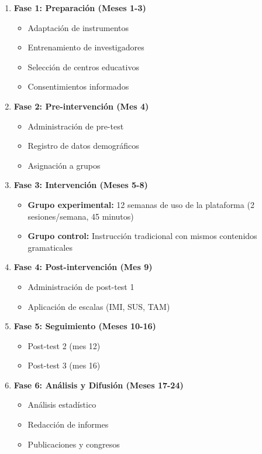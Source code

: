 \documentclass[12pt,a4paper]{article}
\begin{document}
\begin{enumerate}
    \item \textbf{Fase 1: Preparación (Meses 1-3)}
    \begin{itemize}
        \item Adaptación de instrumentos
        \item Entrenamiento de investigadores
        \item Selección de centros educativos
        \item Consentimientos informados
    \end{itemize}
    
    \item \textbf{Fase 2: Pre-intervención (Mes 4)}
    \begin{itemize}
        \item Administración de pre-test
        \item Registro de datos demográficos
        \item Asignación a grupos
    \end{itemize}
    
    \item \textbf{Fase 3: Intervención (Meses 5-8)}
    \begin{itemize}
        \item \textbf{Grupo experimental:} 12 semanas de uso de la plataforma (2 sesiones/semana, 45 minutos)
        \item \textbf{Grupo control:} Instrucción tradicional con mismos contenidos gramaticales
    \end{itemize}
    
    \item \textbf{Fase 4: Post-intervención (Mes 9)}
    \begin{itemize}
        \item Administración de post-test 1
        \item Aplicación de escalas (IMI, SUS, TAM)
    \end{itemize}
    
    \item \textbf{Fase 5: Seguimiento (Meses 10-16)}
    \begin{itemize}
        \item Post-test 2 (mes 12)
        \item Post-test 3 (mes 16)
    \end{itemize}
    
    \item \textbf{Fase 6: Análisis y Difusión (Meses 17-24)}
    \begin{itemize}
        \item Análisis estadístico
        \item Redacción de informes
        \item Publicaciones y congresos
    \end{itemize}
\end{enumerate}
\end{document}
